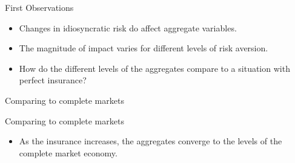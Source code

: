 \documentclass{beamer}
\begin{document}
\begin{frame}{First Observations}
	\begin{itemize}
	
	\item {
	Changes in idiosyncratic risk do affect aggregate variables.
	}

	\item {
	The magnitude of impact varies for different levels of risk aversion.
	}
	
		\item {
	How do the different levels of the aggregates compare to a situation with perfect insurance? 
	}

	\end{itemize}
	
\end{frame}
	

\begin{frame}{Comparing to complete markets}

\end{frame}
	
		
\begin{frame}{Comparing to complete markets}
	\begin{itemize}
	
	\item {
	As the insurance increases, the aggregates converge to the levels of the complete market economy. 
	}


	\end{itemize} 
\end{frame}
\end{document}
